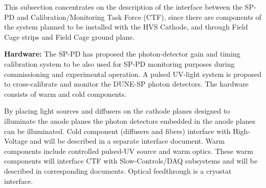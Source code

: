 




This subsection concentrates on the description of the interface between the SP-PD and Calibration/Monitoring Task Force (CTF), since there are components of the system planned to be installed with the HVS Cathode, and through Field Cage strips and Field Cage ground plane.

\textbf{Hardware:} The SP-PD has proposed the photon-detector gain and timing calibration system to be also used for SP-PD monitoring purposes during commissioning and experimental operation. A pulsed UV-light system is proposed to cross-calibrate and monitor the DUNE-SP photon detectors. The hardware consists of warm and cold components. 

By placing light sources and diffusers on the cathode planes designed to illuminate the anode planes the photon detectors embedded in the anode planes can be illuminated. Cold component (diffusers and fibers) interface with High-Voltage and will be described in a separate interface document. Warm components include controlled pulsed-UV source and warm optics. These warm components will interface CTF with Slow-Controls/DAQ subsystems and will be described in corresponding documents. Optical feedthrough is a cryostat interface. 

